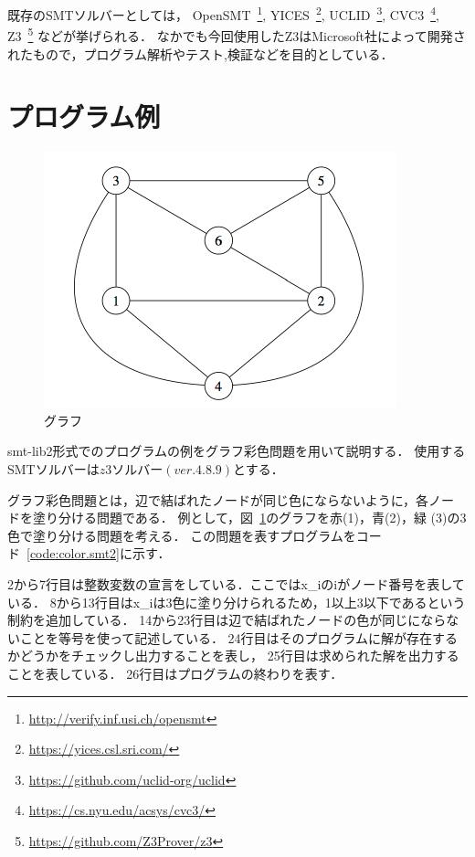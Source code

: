 既存のSMTソルバーとしては，
OpenSMT~\footnote{\url{http://verify.inf.usi.ch/opensmt}},
YICES~\footnote{\url{https://yices.csl.sri.com/}},
UCLID~\footnote{\url{https://github.com/uclid-org/uclid}},
CVC3~\footnote{\url{https://cs.nyu.edu/acsys/cvc3/}},
Z3~\footnote{\url{https://github.com/Z3Prover/z3}}
などが挙げられる．
なかでも今回使用したZ3はMicrosoft社によって開発されたもので，プログラム解析やテスト,検証などを目的としている．


\section{プログラム例}


%
%
\begin{figure}[tb]
  \centering
  \includegraphics[width=0.6\linewidth]{fig/graph3.pdf}
  \caption{グラフ}
  \label{fig:graph}
\end{figure}
smt-lib2形式でのプログラムの例をグラフ彩色問題を用いて説明する．
使用するSMTソルバーは$z3ソルバー(ver.4.8.9)$とする．

グラフ彩色問題とは，辺で結ばれたノードが同じ色にならないように，各ノー
ドを塗り分ける問題である．
例として，図~\ref{fig:graph}のグラフを赤(1)，青(2)，緑
(3)の3色で塗り分ける問題を考える．
この問題を表すプログラムをコード~\ref{code:color.smt2}に示す．

2から7行目は整数変数の宣言をしている．ここではx\_iのiがノード番号を表している．
8から13行目はx\_iは3色に塗り分けられるため，1以上3以下であるという制約を追加している．
14から23行目は辺で結ばれたノードの色が同じにならないことを等号を使って記述している．
24行目はそのプログラムに解が存在するかどうかをチェックし出力することを表し，
25行目は求められた解を出力することを表している．
26行目はプログラムの終わりを表す．

